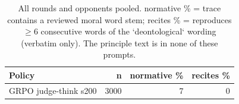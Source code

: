 \begin{table}[t]
\centering
\caption{All rounds and opponents pooled. normative \% = trace contains a reviewed moral word stem; recites \% = reproduces $\geq$6 consecutive words of the `deontological` wording (verbatim only). The principle text is in none of these prompts.}
\label{tab:mr-traces}
\small
\setlength{\tabcolsep}{3.5pt}
\begin{tabular}{lrrr}
\toprule
Policy & n & normative \% & recites \% \\
\midrule
GRPO judge-think s200 & 3000 & 7 & 0 \\
\bottomrule
\end{tabular}
\end{table}
